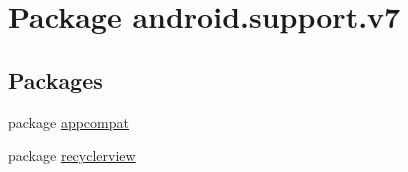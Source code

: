 \hypertarget{namespaceandroid_1_1support_1_1v7}{}\section{Package android.\+support.\+v7}
\label{namespaceandroid_1_1support_1_1v7}
\subsection*{Packages}
\begin{DoxyCompactItemize}
\item 
package \hyperlink{namespaceandroid_1_1support_1_1v7_1_1appcompat}{appcompat}
\item 
package \hyperlink{namespaceandroid_1_1support_1_1v7_1_1recyclerview}{recyclerview}
\end{DoxyCompactItemize}
